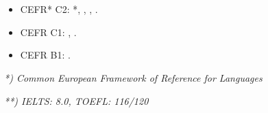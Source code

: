 \section*{\languages}


\begin{itemize}
\item CEFR* C2: \english  **, \danish, \norwegian, \german.
\item CEFR C1: \spanish, \swedish.
\item CEFR B1: \portuguese.
\end{itemize}

\textit{*) Common European Framework of Reference for Languages}

\textit{**) IELTS: 8.0, TOEFL: 116/120}
